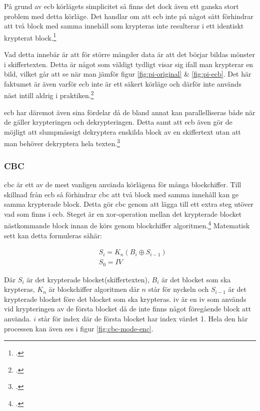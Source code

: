 På grund av \acrshort{ecb} körlägets simplicitet så finns det dock även ett ganska
stort problem med detta körläge. Det handlar om att \acrshort{ecb} inte på något
sätt förhindrar att två block med samma innehåll som krypteras inte resulterar i
ett identiskt krypterat block.\footcite{modesofoperation}

Vad detta innebär är att för större mängder data
är att det börjar bildas mönster i skiffertexten. Detta är något som väldigt
tydligt visar sig ifall man krypterar en bild, vilket går att se när man jämför
figur \ref{fig:pi-original} \& \ref{fig:pi-ecb}.
Det här faktumet är även varför \acrshort{ecb} inte är ett säkert körläge
och därför inte används näst intill aldrig i praktiken.\footcite{modesofoperation}

\acrshort{ecb} har däremot även sina fördelar då de bland annat kan parallelliseras
både när de gäller krypteringen och dekrypteringen. Detta samt att \acrshort{ecb}
även gör de möjligt att slumpmässigt dekryptera enskilda block av en skiffertext
utan att man behöver dekryptera hela texten.\footcite{modesofoperation}

\subsubsection{CBC}
\acrlong{cbc} är ett av de mest vanligen använda körlägena för många blockchiffer.
Till skillnad från \acrshort{ecb} så förhindrar \acrshort{cbc} att två block med
samma innehåll kan ge samma krypterade block. Detta gör \acrshort{cbc} genom att
lägga till ett extra steg utöver vad som finns i \acrshort{ecb}. Steget
är en \gls{xor}-operation mellan det krypterade blocket nästkommande block innan
de körs genom blockchiffer algoritmen.\footcite{modesofoperation}
Matematisk sett kan detta formuleras såhär:

\begin{equation}
    \label{eq:cbc-encryption}
    \begin{aligned}
        &S_i = K_n(B_i \oplus S_{i-1})\\\nonumber
        &S_0 = IV
    \end{aligned}
\end{equation}

Där $S_i$ är det krypterade blocket(skiffertexten), $B_i$ är det blocket som ska krypteras,
$K_n$ är blockchiffer algoritmen där $n$ står för nyckeln och $S_{i-1}$ är
det krypterade blocket före det blocket som ska krypteras. \acrshort{iv} är en
\acrfull{iv} som används vid krypteringen av de första blocket då de inte finns
något föregående block att använda. $i$ står för index där de första blocket har
index värdet 1. Hela den här processen kan även ses i figur \ref{fig:cbc-mode-enc}.

